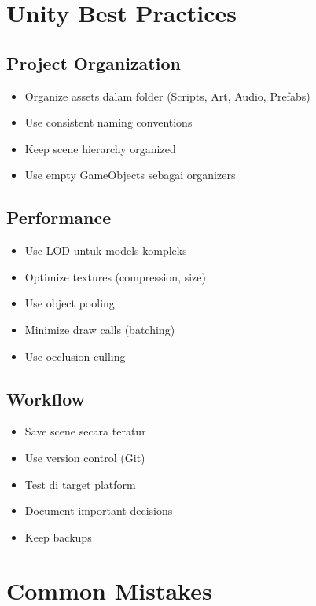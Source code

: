 \section{Unity Best Practices}

\subsection{Project Organization}

\begin{itemize}
\item Organize assets dalam folder (Scripts, Art, Audio, Prefabs)
\item Use consistent naming conventions
\item Keep scene hierarchy organized
\item Use empty GameObjects sebagai organizers
\end{itemize}

\subsection{Performance}

\begin{itemize}
\item Use LOD untuk models kompleks
\item Optimize textures (compression, size)
\item Use object pooling
\item Minimize draw calls (batching)
\item Use occlusion culling
\end{itemize}

\subsection{Workflow}

\begin{itemize}
\item Save scene secara teratur
\item Use version control (Git)
\item Test di target platform
\item Document important decisions
\item Keep backups
\end{itemize}

\section{Common Mistakes}

